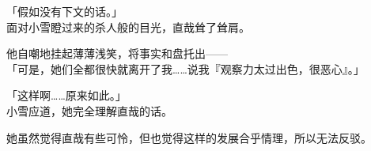 「假如没有下文的话。」\\

面对小雪瞪过来的杀人般的目光，直哉耸了耸肩。

他自嘲地挂起薄薄浅笑，将事实和盘托出——\\

「可是，她们全都很快就离开了我……说我『观察力太过出色，很恶心』。」

「这样啊……原来如此。」\\

小雪应道，她完全理解直哉的话。

她虽然觉得直哉有些可怜，但也觉得这样的发展合乎情理，所以无法反驳。
